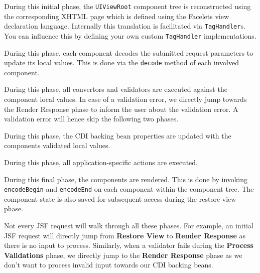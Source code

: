 \begin{description}[style=nextline]
	\item[Restore View]
	During this initial phase, the \texttt{UIViewRoot} component tree is reconstructed using the corresponding XHTML page which is defined using the Facelets view declaration language.
	Internally this translation is facilitated via \texttt{TagHandler}s.
	You can influence this by defining your own custom \texttt{TagHandler} implementations.
	\item[Apply Request Values]
	During this phase, each component decodes the submitted request parameters to update its local values.
	This is done via the \texttt{decode} method of each involved component.
	\item[Process Validations]
	During this phase, all convertors and validators are executed against the component local values.
	In case of a validation error, we directly jump towards the Render Response phase to inform the user about the validation error.
	A validation error will hence skip the following two phases.
	\item[Update Model Values]
	During this phase, the CDI backing bean properties are updated with the components validated local values.
	\item[Invoke Application]
	During this phase, all application-specific actions are executed.
	\item[Render Response]
	During this final phase, the components are rendered.
	This is done by invoking \texttt{encodeBegin} and \texttt{encodeEnd} on each component within the component tree.
	The component state is also saved for subsequent access during the restore view phase.
\end{description}
Not every JSF request will walk through all these phases. For example, an initial JSF request will directly jump from \textbf{Restore View} to \textbf{Render Response} as there is no input to process.
Similarly, when a validator fails during the \textbf{Process Validations} phase, we directly jump to the \textbf{Render Response} phase as we don't want to process invalid input towards our CDI backing beans.

